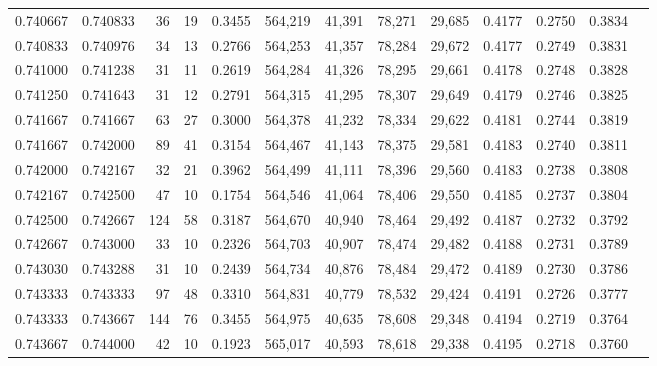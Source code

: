 \begin{tabular}{rrrrrrrrrrrrr}
0.740667 & 0.740833 &    36 &  19 &                                     0.3455 & 564,219 &  41,391 &  78,271 &  29,685 & 0.4177 & 0.2750 & 0.3834 \\
0.740833 & 0.740976 &    34 &  13 &                                     0.2766 & 564,253 &  41,357 &  78,284 &  29,672 & 0.4177 & 0.2749 & 0.3831 \\
0.741000 & 0.741238 &    31 &  11 &                                     0.2619 & 564,284 &  41,326 &  78,295 &  29,661 & 0.4178 & 0.2748 & 0.3828 \\
0.741250 & 0.741643 &    31 &  12 &                                     0.2791 & 564,315 &  41,295 &  78,307 &  29,649 & 0.4179 & 0.2746 & 0.3825 \\
0.741667 & 0.741667 &    63 &  27 &                                     0.3000 & 564,378 &  41,232 &  78,334 &  29,622 & 0.4181 & 0.2744 & 0.3819 \\
0.741667 & 0.742000 &    89 &  41 &                                     0.3154 & 564,467 &  41,143 &  78,375 &  29,581 & 0.4183 & 0.2740 & 0.3811 \\
0.742000 & 0.742167 &    32 &  21 &                                     0.3962 & 564,499 &  41,111 &  78,396 &  29,560 & 0.4183 & 0.2738 & 0.3808 \\
0.742167 & 0.742500 &    47 &  10 &                                     0.1754 & 564,546 &  41,064 &  78,406 &  29,550 & 0.4185 & 0.2737 & 0.3804 \\
0.742500 & 0.742667 &   124 &  58 &                                     0.3187 & 564,670 &  40,940 &  78,464 &  29,492 & 0.4187 & 0.2732 & 0.3792 \\
0.742667 & 0.743000 &    33 &  10 &                                     0.2326 & 564,703 &  40,907 &  78,474 &  29,482 & 0.4188 & 0.2731 & 0.3789 \\
0.743030 & 0.743288 &    31 &  10 &                                     0.2439 & 564,734 &  40,876 &  78,484 &  29,472 & 0.4189 & 0.2730 & 0.3786 \\
0.743333 & 0.743333 &    97 &  48 &                                     0.3310 & 564,831 &  40,779 &  78,532 &  29,424 & 0.4191 & 0.2726 & 0.3777 \\
0.743333 & 0.743667 &   144 &  76 &                                     0.3455 & 564,975 &  40,635 &  78,608 &  29,348 & 0.4194 & 0.2719 & 0.3764 \\
0.743667 & 0.744000 &    42 &  10 &                                     0.1923 & 565,017 &  40,593 &  78,618 &  29,338 & 0.4195 & 0.2718 & 0.3760 \\

\end{tabular}
